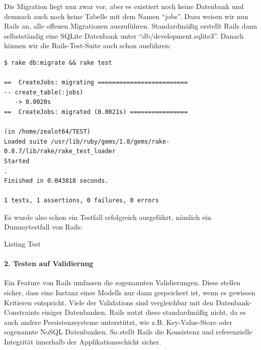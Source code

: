 Die Migration liegt nun zwar vor, aber es existiert noch keine Datenbank und demnach auch noch keine Tabelle mit dem Namen "`jobs"'. Dazu weisen wir nun Rails an, alle offenen Migrationen auszuführen. Standardmäßig erstellt Rails dann selbstständig eine SQLite Datenbank unter "`db/development.sqlite3"'.
Danach können wir die Rails-Test-Suite auch schon ausführen:

\begin{lstlisting}
$ rake db:migrate && rake test
 
==  CreateJobs: migrating =========================
-- create_table(:jobs)
   -> 0.0020s
==  CreateJobs: migrated (0.0021s) ================

(in /home/zealot64/TEST)
Loaded suite /usr/lib/ruby/gems/1.8/gems/rake-0.8.7/lib/rake/rake_test_loader
Started
.
Finished in 0.043818 seconds.

1 tests, 1 assertions, 0 failures, 0 errors

\end{lstlisting}

Es wurde also schon ein Testfall erfolgreich ausgeführt, nämlich ein Dummytestfall von Rails:

\begin{ruby}[label={test/units/job\_test.rb}]
 

   
    
     
\end{ruby}
\label{list:bla}
\captionsetup{type=lstlisting}
\caption{Listing Test}


\paragraph{2. Testen auf Validierung}

Ein Feature von Rails umfassen die sogenannten Validierungen. Diese stellen sicher, dass eine Instanz eines Modells nur dann gespeichert ist, wenn es gewissen Kritieren entspricht. Viele der Validations sind vergleichbar mit den Datenbank-Constraints einiger Datenbanken. Rails nutzt diese standardmäßig nicht, da es auch andere Persistenzsysteme unterstützt, wie z.B. Key-Value-Store oder sogenannte NoSQL Datenbanken. So stellt Rails die Konsistenz und referenzielle Integrität innerhalb der Applikationsschicht sicher.

